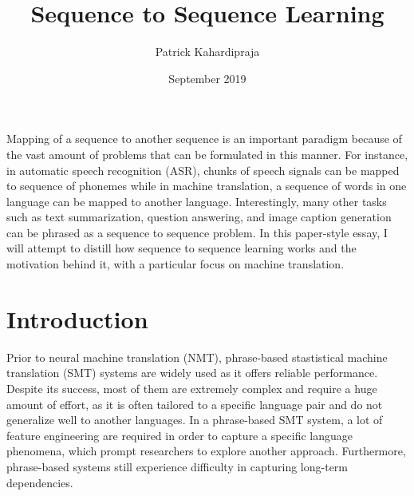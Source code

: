 \documentclass[12pt]{extarticle}
\title{Sequence to Sequence Learning}
\author{Patrick Kahardipraja}
\date{September 2019}
\begin{document}

\maketitle

Mapping of a sequence to another sequence is an important paradigm because of the vast amount of problems that can be formulated in this manner. For instance, in automatic speech recognition (ASR), chunks of speech signals can be mapped to sequence of phonemes while in machine translation, a sequence of words in one language can be mapped to another language. Interestingly, many other tasks such as text summarization, question answering, and image caption generation can be phrased as a sequence to sequence problem. In this paper-style essay, I will attempt to distill how sequence to sequence learning works and the motivation behind it, with a particular focus on machine translation.


\section*{Introduction}


Prior to neural machine translation (NMT), phrase-based stastistical machine translation (SMT) systems are widely used as it offers reliable performance. Despite its success, most of them are extremely complex and require a huge amount of effort, as it is often tailored to a specific language pair and do not generalize well to another languages. In a phrase-based SMT system, a lot of feature engineering are required in order to capture a specific language phenomena, which prompt researchers to explore another approach. Furthermore, phrase-based systems still experience difficulty in capturing long-term dependencies.
\end{document}
